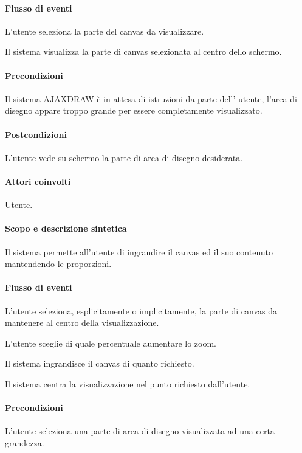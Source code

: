 \paragraph{Flusso di eventi}
\begin{elenconumerato}[\textbf{}]{\subsubsecindent}
\item L'utente seleziona la parte del canvas da visualizzare.
\item Il sistema visualizza la parte di canvas selezionata al centro dello schermo.
\end{elenconumerato}
\paragraph{Precondizioni} Il sistema AJAXDRAW \`e in attesa di istruzioni da parte dell' utente, l'area di disegno appare troppo grande per essere completamente visualizzato.
\paragraph{Postcondizioni} L'utente vede su schermo la parte di area di disegno desiderata.

\paragraph{Attori coinvolti} Utente.
\paragraph{Scopo e descrizione sintetica} 
Il sistema permette all'utente di ingrandire il canvas ed il suo contenuto mantendendo le proporzioni.
\paragraph{Flusso di eventi}
\begin{elenconumerato}[\textbf{}]{\subsubsecindent}
\item L'utente seleziona, esplicitamente o implicitamente, la parte di canvas da mantenere al centro della visualizzazione.
\item L'utente sceglie di quale percentuale aumentare lo zoom.
\item Il sistema ingrandisce il canvas di quanto richiesto.
\item Il sistema centra la visualizzazione nel punto richiesto dall'utente.
\end{elenconumerato}
\paragraph{Precondizioni} L'utente seleziona una parte di area di disegno visualizzata ad una certa grandezza.
